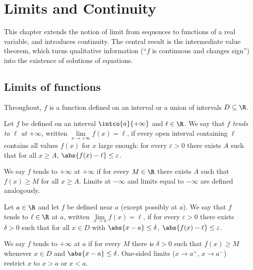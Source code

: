 \chapter{Limits and Continuity}\label{ch:tle:limcont}

This chapter extends the notion of limit from sequences to functions of a
real variable, and introduces continuity. The central result is the
intermediate value theorem, which turns qualitative information (``$f$ is
continuous and changes sign'') into the existence of solutions of equations.

\section{Limits of functions}

Throughout, $f$ is a function defined on an interval or a union of intervals
$D \subseteq \R$.

\begin{definition}\label{def:tle:limcont:liminf}
Let $f$ be defined on an interval $\intco{a}{+\infty}$ and $\ell \in \R$. We
say that $f$ \emph{tends to $\ell$ at $+\infty$},
written $\lim\limits_{x\to+\infty} f(x) = \ell$, if every open interval
containing $\ell$ contains all values $f(x)$ for $x$ large enough:
for every $\varepsilon > 0$ there exists $A$ such that for all $x \geq A$,
$\abs{f(x) - \ell} \leq \varepsilon$.

We say $f$ tends to $+\infty$ at $+\infty$ if for every $M \in \R$ there
exists $A$ such that $f(x) \geq M$ for all $x \geq A$. Limits at $-\infty$
and limits equal to $-\infty$ are defined analogously.
\end{definition}

\begin{definition}\label{def:tle:limcont:limpoint}
Let $a \in \R$ and let $f$ be defined near $a$ (except possibly at $a$). We
say that $f$ tends to $\ell \in \R$ at $a$, written
$\lim\limits_{x \to a} f(x) = \ell$, if for every $\varepsilon > 0$ there
exists $\delta > 0$ such that for all $x \in D$ with
$\abs{x - a} \leq \delta$, $\abs{f(x) - \ell} \leq \varepsilon$.

We say $f$ tends to $+\infty$ at $a$ if for every $M$ there is $\delta > 0$
such that $f(x) \geq M$ whenever $x \in D$ and $\abs{x - a} \leq \delta$.
One-sided limits ($x \to a^+$, $x \to a^-$) restrict $x$ to $x > a$ or
$x < a$.
\end{definition}

